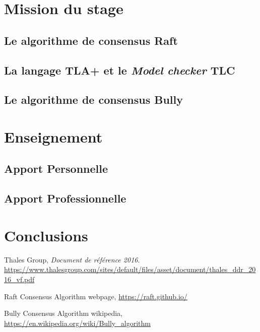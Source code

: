 \documentclass[a4paper, 12pt]{article} %
\begin{document}
\newpage
\section{Mission du stage}
\subsection{Le algorithme de consensus Raft}
\subsection{La langage TLA+ et le \textit{Model checker} TLC}
\subsection{Le algorithme de consensus Bully}

\newpage
\section{Enseignement}

\subsection{Apport Personnelle}

\subsection{Apport Professionnelle}


\newpage
\section{Conclusions}

\newpage

\begin{thebibliography}{3}
	Thales Group,  
	\textit{Document de référence 2016}.
	\url{https://www.thalesgroup.com/sites/default/files/asset/document/thales_ddr_2016_vf.pdf}
	
	Raft Consensus Algorithm webpage,
	\url{https://raft.github.io/}
	
	Bully Consensus Algorithm wikipedia,
	\url{https://en.wikipedia.org/wiki/Bully_algorithm}
\end{thebibliography}
\end{document}

